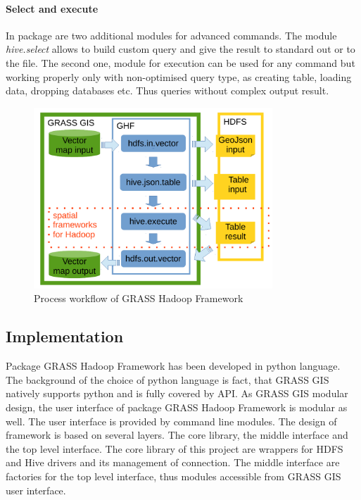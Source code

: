 \documentclass[a4paper,12pt,oneside]{report}
\begin{document}
\paragraph{Select and execute} In package are two additional modules for advanced commands. The module \textit{hive.select} allows to build custom query and give the result to standard out or to the file. The second one, module for execution can be used for any command but working properly only with non-optimised query type, as creating table, loading data, dropping databases etc. Thus queries without complex output result.


\begin{figure}[!htbp]
   \centering
   \includegraphics[width=0.8\textwidth]{./img/modules_schema.pdf}
   \caption[GHF workflow]{\centering Process workflow of GRASS Hadoop Framework  }
\end{figure} 
 
\subsection{Implementation}
Package GRASS Hadoop Framework has been developed in python language. The background of the choice of python language is fact, that GRASS GIS natively supports python and is fully covered by  API. As GRASS GIS modular design, the user interface of package GRASS Hadoop Framework is modular as well. The user interface is provided by command line modules. 
The design of framework is based on several layers. The core library, the middle interface and the top level interface. The core library of this project are wrappers for HDFS and Hive drivers and its management of connection. The middle interface are factories for the top level interface, thus modules  accessible from GRASS GIS user interface.
\end{document}

